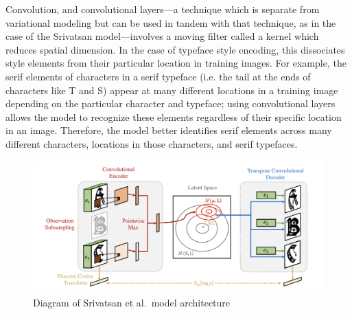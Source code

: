 Convolution, and convolutional layers---a technique which is separate from variational modeling but can be used in tandem with that technique, as in the case of the Srivatsan model---involves a moving filter called a kernel which reduces spatial dimension. In the case of typeface style encoding, this dissociates style elements from their particular location in training images. For example, the serif elements of characters in a serif typeface (i.e. the tail at the ends of characters like T and S) appear at many different locations in a training image depending on the particular character and typeface; using convolutional layers allows the model to recognize these elements regardless of their specific location in an image. Therefore, the model better identifies serif elements across many different characters, locations in those characters, and serif typefaces.

\begin{figure}[]
    \centering
    \includegraphics[width=\textwidth]{images/srivatsan-model.png}
    \caption{Diagram of Srivatsan et al.\ model architecture \cite{srivatsan2020}}
    \label{fig:srivatsan-model-2}
\end{figure}

